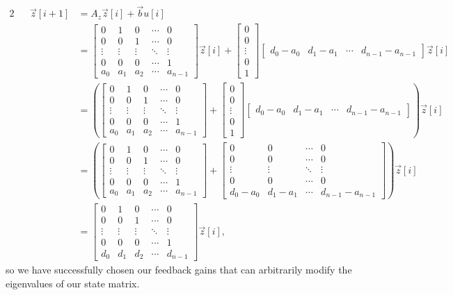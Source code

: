 \documentclass[letterpaper]{article}
\theoremstyle{remark}
\newcommand{\mat}[1]{\ensuremath{\begin{bmatrix}#1\end{bmatrix}}}
\newcommand{\eqn}[1]{\begin{alignat*}{2}#1\end{alignat*}}
\begin{document}
\eqn{
    && \vec{z}[i + 1] &= A_z \vec{z}[i] + \vec{b}u[i] \\
    &&&= \mat{
    0 & 1 & 0 & \cdots & 0 \\ 
    0 & 0 & 1 & \cdots & 0 \\
    \vdots & \vdots & \vdots & \ddots & \vdots \\
    0 & 0 & 0 & \cdots & 1 \\
    a_0 & a_1 & a_2 & \cdots & a_{n - 1}
    } \vec{z}[i] + \mat{0 \\ 0 \\ \vdots \\ 0 \\ 1} \mat{d_0 - a_0 & d_1 - a_1 & \cdots & d_{n-1} - a_{n-1}} \vec{z}[i] \\
    &&&= \left(
    \mat{
    0 & 1 & 0 & \cdots & 0 \\ 
    0 & 0 & 1 & \cdots & 0 \\
    \vdots & \vdots & \vdots & \ddots & \vdots \\
    0 & 0 & 0 & \cdots & 1 \\
    a_0 & a_1 & a_2 & \cdots & a_{n - 1}
    } + \mat{0 \\ 0 \\ \vdots \\ 0 \\ 1} \mat{d_0 - a_0 & d_1 - a_1 & \cdots & d_{n-1} - a_{n-1}} \right) \vec{z}[i]\\
    &&&= \left(
    \mat{
    0 & 1 & 0 & \cdots & 0 \\ 
    0 & 0 & 1 & \cdots & 0 \\
    \vdots & \vdots & \vdots & \ddots & \vdots \\
    0 & 0 & 0 & \cdots & 1 \\
    a_0 & a_1 & a_2 & \cdots & a_{n - 1}
    } + 
    \mat{
    0 & 0 & \cdots & 0 \\
    0 & 0 & \cdots & 0 \\
    \vdots & \vdots & \ddots & \vdots \\
    0 & 0 & \cdots & 0 \\
    d_0 - a_0 & d_1 - a_1 & \cdots & d_{n-1} - a_{n-1}
    }
    \right) \vec{z}[i] \\
    &&&=
    \mat{
    0 & 1 & 0 & \cdots & 0 \\ 
    0 & 0 & 1 & \cdots & 0 \\
    \vdots & \vdots & \vdots & \ddots & \vdots \\
    0 & 0 & 0 & \cdots & 1 \\
    d_0 & d_1 & d_2 & \cdots & d_{n - 1}
    } \vec{z}[i],
}
so we have successfully chosen our feedback gains that can arbitrarily modify the eigenvalues of our state matrix.
\end{document}

